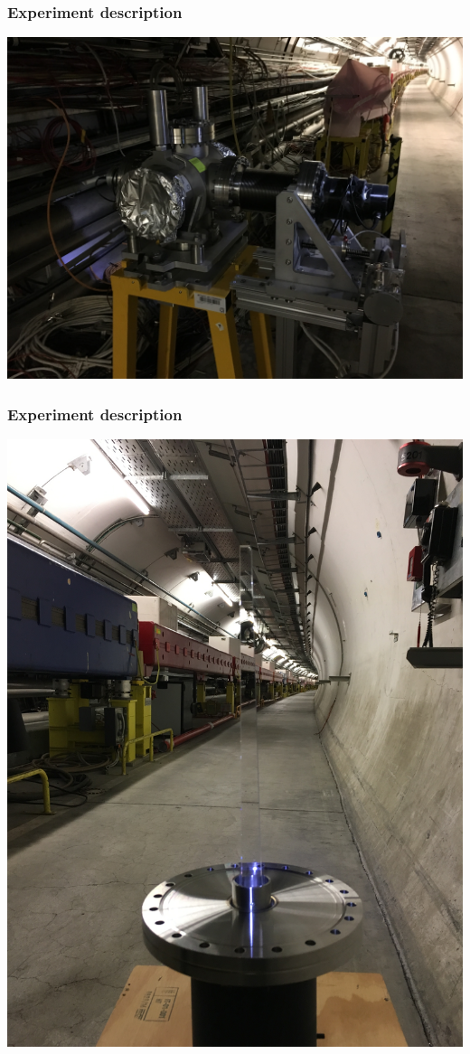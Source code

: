 \begin{frame}
\frametitle{Experiment description}
\includegraphics[width=0.95\linewidth]{./photos_Format02/IMG-2840.JPG}
\begin{figure}
\end{figure}
\end{frame}


\begin{frame}
\frametitle{Experiment description}
\includegraphics[width=0.95\linewidth]{./photos_Format02/IMG-2846.JPG}
\begin{figure}
\end{figure}
\end{frame}


